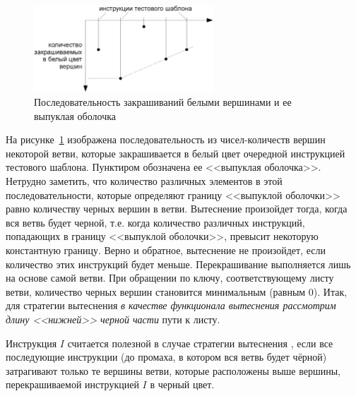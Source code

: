 \begin{figure}[h] \center
  \includegraphics[width=0.6\textwidth]{2.theor/white_feeds}
  \caption{Последовательность закрашиваний белыми вершинами и ее выпуклая
оболочка}\label{fig:white-feeds}
\end{figure}

На рисунке~\ref{fig:white-feeds} изображена последовательность из
чисел-количеств вершин некоторой ветви, которые закрашивается в белый цвет
очередной инструкцией тестового шаблона. Пунктиром обозначена ее <<выпуклая
оболочка>>. Нетрудно заметить, что количество различных элементов в этой последовательности, которые
определяют границу <<выпуклой оболочки>> равно количеству черных вершин в
ветви. Вытеснение произойдет тогда, когда вся ветвь будет черной, т.е. когда
количество различных инструкций, попадающих в границу <<выпуклой оболочки>>,
превысит некоторую константную границу. Верно и обратное, вытеснение не
произойдет, если количество этих инструкций будет меньше. Перекрашивание
выполняется лишь на основе самой ветви. При обращении по ключу, соответствующему листу ветви, количество черных вершин становится минимальным (равным 0). Итак, для стратегии вытеснения \PseudoLRU \emph{в
качестве функционала вытеснения рассмотрим длину <<нижней>> черной части} пути к
листу.

%

\begin{utv}
Инструкция $I$ считается полезной в случае стратегии вытеснения
\PseudoLRU, если все последующие инструкции (до промаха, в котором вся ветвь будет чёрной) затрагивают только те
вершины ветви, которые расположены выше вершины, перекрашиваемой инструкцией $I$
в черный цвет.
\end{utv}

